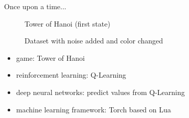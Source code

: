 \documentclass{beamer}
\begin{document}
\begin{frame}{Once upon a time...}
	\begin{minipage}{0.5\textwidth}
		\begin{figure}[H]
			\caption*{Tower of Hanoi (first state)}
		\end{figure}
		\vspace*{-1.3cm}
		\begin{figure}[H]
			\centering
			\captionsetup{justification=centering}
			\caption*{Dataset with noise added and color changed}
		\end{figure}
	\end{minipage} \hfill
	\begin{minipage}{0.45\textwidth}
		\begin{itemize}
			\item game: Tower of Hanoi
			\item reinforcement learning: Q-Learning
			\item deep neural networks: predict values from Q-Learning
			\item machine learning framework: Torch based on Lua
		\end{itemize}
	\end{minipage}
\end{frame}
\end{document}
